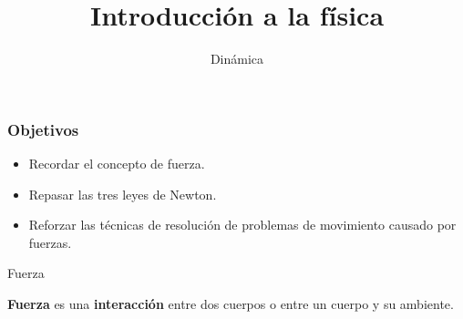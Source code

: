 \documentclass[9pt, aspectratio=169]{beamer}
\title{Introducción a la física}
\subtitle{Dinámica}
\begin{document}
\maketitle
\begin{frame}
  \frametitle{Objetivos}
\Large

\begin{itemize}
 \item Recordar el concepto de fuerza.
 \item Repasar las tres leyes de Newton.
 \item Reforzar las técnicas de resolución de problemas de movimiento causado por fuerzas.
\end{itemize}
\end{frame}

\begin{frame}{Fuerza}
\begin{definition}[Fuerza]
    \textbf{Fuerza} es una \textbf{interacción} entre dos cuerpos o entre un cuerpo y su ambiente.
\end{definition}
\pause


\end{frame}
\end{document}
